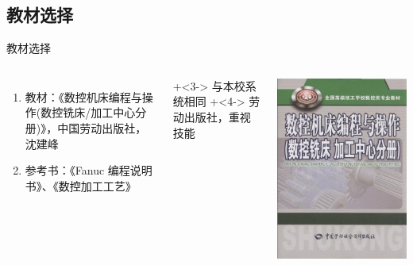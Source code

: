 \documentclass[UTF8,zihao=-4,handout,smaller,aspectratio=1610]{ctexbeamer}
\begin{document}
\subsection{教材选择}
\begin{frame}{教材选择}
	\begin{columns}[onlytextwidth]

\begin{enumerate}
   \item<1-> 教材：《数控机床编程与操作(数控铣床/加工中心分册)》，中国劳动出版社，沈建峰     
    \item<2->参考书：《Fanuc 编程说明书》、《数控加工工艺》
\end{enumerate}
    \onslide+<3-> 与本校系统相同 \onslide+<4-> 劳动出版社，重视技能

    \includegraphics[width=0.9\linewidth,trim=0 0 0 0,clip,angle=0]{image/5.jpg}
	\end{columns}
\end{frame}
\end{document}
